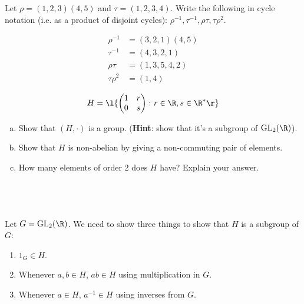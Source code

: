 \documentclass[a4paper]{article}
\begin{document}


\begin{questionbody}
Let $\rho = (1, 2, 3) (4, 5)$ and $\tau = (1, 2, 3, 4)$. Write the following in cycle notation (i.e. as a product of disjoint cycles): $\rho^{-1}, \tau^{-1}, \rho \tau, \tau \rho^2$.
\end{questionbody}

\begin{align*}
\rho^{-1} &= (3, 2, 1) (4, 5) \\
\tau^{-1} &= (4, 3, 2, 1) \\
\rho \tau &= (1, 3, 5, 4, 2) \\
\tau \rho^2 &= (1, 4)
\end{align*}


\renewcommand{\thesubsection}{Q\arabic{section}~(\alph{subsection})}

\begin{questionbody}
\[ H = \l\{ \begin{pmatrix} 1 & r \\ 0 & s \end{pmatrix} \colon r \in \R, s \in \R^* \r\} \]
\begin{enumerate}[(a)]
\item Show that $(H, \cdot)$ is a group. (\textbf{Hint}: show that it's a subgroup of $\mathrm{GL}_2(\R)$).
\item Show that $H$ is non-abelian by giving a non-commuting pair of elements.
\item How many elements of order 2 does $H$ have? Explain your answer.
\end{enumerate}
\end{questionbody}

\subsection{~} %

Let $G = \mathrm{GL}_2(\R)$. We need to show three things to show that $H$ is a subgroup of $G$:
\begin{enumerate}[1)]
\item $1_G \in H$.
\item Whenever $a, b \in H$, $ab \in H$ using multiplication in $G$.
\item Whenever $a \in H$, $a^{-1} \in H$ using inverses from $G$.
\end{enumerate}
\end{document}
